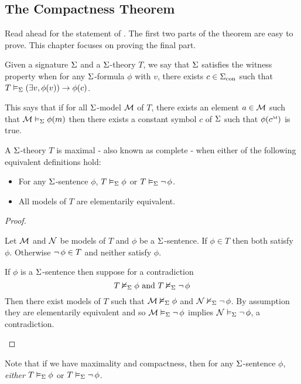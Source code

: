 \subsection{The Compactness Theorem}

Read ahead for the statement of .
The first two parts of the theorem are easy to prove.
This chapter focuses on proving the final part.

\begin{dfn}
    Given a signature $\Sigma$ and a $\Sigma$-theory $T$, 
    we say that $\Sigma$ satisfies the witness property when
    for any $\Sigma$-formula $\phi$ with 
     $v$,
    there exists $c \in {\Sigma}_\mathrm{con}$ such that 
    $T \vDash_{\Sigma} \left(\exists v, \phi(v)\right) \to \phi(c)$.
\end{dfn}
This says that if for all $\Sigma$-model $\mathcal{M}$ of $T$,
there exists an element $a \in \mathcal{M}$ such that $\mathcal{M} \vDash_{\Sigma} \phi(m)$
then there exists a constant symbol $c$ of $\Sigma$ 
such that $\phi(\mmintp{c})$ is true.

\begin{dfn}
    A $\Sigma$-theory $T$ is maximal - also known as complete
    - when either of the following equivalent 
    definitions hold:
    \begin{itemize}
        \item For any $\Sigma$-sentence $\phi$, 
            $T \vDash_{\Sigma} \phi$ or 
            $T \vDash_{\Sigma} \neg\, \phi$.
        \item All models of $T$ are elementarily equivalent.
    \end{itemize}
\end{dfn}
\begin{proof}
    \begin{forward}
        Let $\mathcal{M}$ and $\mathcal{N}$ be models of $T$
        and $\phi$ be a $\Sigma$-sentence.
        If $\phi \in T$ then both satisfy $\phi$.
        Otherwise $\neg\, \phi \in T$ and neither satisfy $\phi$.
    \end{forward}
    
    \begin{backward}
        If $\phi$ is a $\Sigma$-sentence then suppose for a contradiction 
        \[T \nvDash_{\Sigma} \phi \text{ and } T \nvDash_{\Sigma} \neg\, \phi\]
        Then there exist models of $T$
        such that $\mathcal{M} \nvDash_{\Sigma} \phi$ and $\mathcal{N} \nvDash_{\Sigma} \neg\, \phi$.
        By assumption they are elementarily equivalent and so 
        $\mathcal{M} \vDash_{\Sigma} \neg\, \phi$ implies $\mathcal{N} \vDash_{\Sigma} \neg\, \phi$,
        a contradiction.
    \end{backward}
\end{proof}
Note that if we have maximality and compactness,
then for any $\Sigma$-sentence $\phi$,
\emph{either} $T \vDash_{\Sigma} \phi$ or 
$T \vDash_{\Sigma} \neg\, \phi$.

